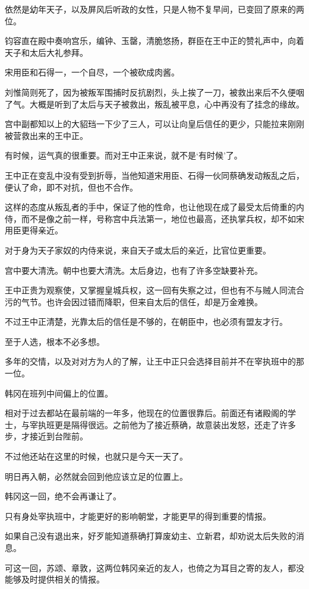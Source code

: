依然是幼年天子，以及屏风后听政的女性，只是人物不复早间，已变回了原来的两位。

钧容直在殿中奏响宫乐，编钟、玉罄，清脆悠扬，群臣在王中正的赞礼声中，向着天子和太后大礼参拜。

宋用臣和石得一，一个自尽，一个被砍成肉酱。

刘惟简则死了，因为被叛军围捕时反抗剧烈，头上挨了一刀，被救出来后不久便咽了气。大概是听到了太后与天子被救出，叛乱被平息，心中再没有了挂念的缘故。

宫中副都知以上的大貂珰一下少了三人，可以让向皇后信任的更少，只能拉来刚刚被营救出来的王中正。

有时候，运气真的很重要。而对王中正来说，就不是‘有时候’了。

王中正在变乱中没有受到折辱，当他知道宋用臣、石得一伙同蔡确发动叛乱之后，便认了命，即不对抗，但也不合作。

这样的态度从叛乱者的手中，保证了他的性命，也让他现在成了最受太后倚重的内侍，而不是像之前一样，号称宫中兵法第一，地位也最高，还执掌兵权，却不如宋用臣更得亲近。

对于身为天子家奴的内侍来说，来自天子或太后的亲近，比官位更重要。

宫中要大清洗。朝中也要大清洗。太后身边，也有了许多空缺要补充。

王中正贵为观察使，又掌握皇城兵权，这一回有失察之过，但也有不与贼人同流合污的气节。也许会因过错而降职，但来自太后的信任，却是万金难换。

不过王中正清楚，光靠太后的信任是不够的，在朝臣中，也必须有盟友才行。

至于人选，根本不必多想。

多年的交情，以及对对方为人的了解，让王中正只会选择目前并不在宰执班中的那一位。

韩冈在班列中间偏上的位置。

相对于过去都站在最前端的一年多，他现在的位置很靠后。前面还有诸殿阁的学士，与宰执班更是隔得很远。之前他为了接近蔡确，故意装出发怒，还走了许多步，才接近到台陛前。

不过他还站在这里的时候，也就只是今天一天了。

明日再入朝，必然就会回到他应该立足的位置上。

韩冈这一回，绝不会再谦让了。

只有身处宰执班中，才能更好的影响朝堂，才能更早的得到重要的情报。

如果自己没有退出来，好歹能知道蔡确打算废幼主、立新君，却劝说太后失败的消息。

可这一回，苏颂、章敦，这两位韩冈亲近的友人，也倚之为耳目之寄的友人，都没能够及时提供相关的情报。

